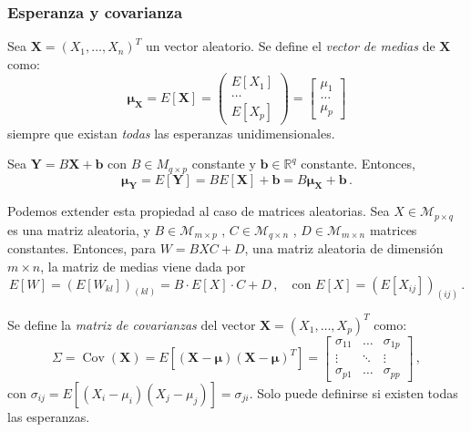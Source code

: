 \subsubsection{Esperanza y covarianza}
\begin{ndef}
  Sea $\boldsymbol X=(X_1,\dots,X_n)^T$ un vector aleatorio. Se define el \emph{vector de medias} de $\boldsymbol X$ como:
  \[
  \boldsymbol \mu_{\boldsymbol X} = E[\boldsymbol X] = \begin{pmatrix}  E[X_1] \\ \dots \\ E[X_p] \end{pmatrix} = \begin{bmatrix} \mu_1 \\ \dots \\ \mu_p \end{bmatrix}
  \]
  siempre que existan \emph{todas} las esperanzas unidimensionales.
  \end{ndef}

\begin{nprop}
  Sea $\boldsymbol Y = B\boldsymbol X + \boldsymbol b$ con $B \in M_{q\times p}$ constante y $\boldsymbol b \in \mathbb R^q$ constante. Entonces,
  \[
    \boldsymbol \mu_{\boldsymbol Y} = E[\boldsymbol Y] = BE[\boldsymbol X] + \boldsymbol b = B\boldsymbol \mu_{\boldsymbol X} + \boldsymbol b\,.
\]
\end{nprop}

Podemos extender esta propiedad al caso de matrices aleatorias. Sea $X\in \mathcal M_{p\times q}$ es una matriz aleatoria, y $B\in \mathcal M_{m\times p}$ , $C \in \mathcal M_{q\times n}$ , $D \in \mathcal M_{m \times n}$ matrices constantes. Entonces, para $W = BXC + D$, una matriz aleatoria de dimensión $m\times n$, la matriz de medias viene dada por
\[
E[W] = \left(E[W_{kl}]\right)_{(kl)} = B \cdot E[X] \cdot C + D\,, \quad \text{con } E[X] = \left(E[X_{ij}]\right)_{(ij)}\,.
\]

\begin{ndef}
  Se define la \emph{matriz de covarianzas} del vector $\boldsymbol X = (X_1,\dots,X_p)^T$ como:
  \[
\Sigma = \operatorname{Cov}(\boldsymbol X) = E\left[(\boldsymbol X-\boldsymbol \mu)(\boldsymbol X-\boldsymbol \mu)^T\right] = \begin{bmatrix} \sigma_{11} & \dots & \sigma_{1p} \\ \vdots& \ddots & \vdots \\ \sigma_{p1} &  \dots & \sigma_{pp}\end{bmatrix}\,,
\]
con $\sigma_{ij} = E\left[(X_i - \mu_i)(X_j - \mu_j)\right] = \sigma_{ji}$. Solo puede definirse si existen todas las esperanzas. 
\end{ndef}


